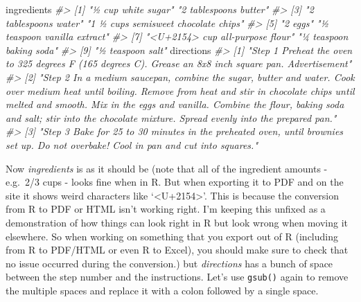 \documentclass[
  12pt,
]{book}
\newenvironment{Shaded}{\begin{snugshade}}{\end{snugshade}}
\newcommand{\CommentTok}[1]{\textcolor[rgb]{0.37,0.37,0.37}{\textit{#1}}}
\newcommand{\NormalTok}[1]{#1}
\begin{document}
\begin{Shaded}
\begin{Highlighting}[]
\NormalTok{ingredients}
\CommentTok{\#\textgreater{} [1] "½ cup white sugar"                  "2 tablespoons butter"              }
\CommentTok{\#\textgreater{} [3] "2 tablespoons water"                "1 ½ cups semisweet chocolate chips"}
\CommentTok{\#\textgreater{} [5] "2  eggs"                            "½ teaspoon vanilla extract"        }
\CommentTok{\#\textgreater{} [7] "\textless{}U+2154\textgreater{} cup all{-}purpose flour"     "¼ teaspoon baking soda"            }
\CommentTok{\#\textgreater{} [9] "½ teaspoon salt"}
\NormalTok{directions}
\CommentTok{\#\textgreater{} [1] "Step 1                                                                                                                                                                                                                                          Preheat the oven to 325 degrees F (165 degrees C). Grease an 8x8 inch square pan.                                                                                                                                                                                                                                                                                      Advertisement"}
\CommentTok{\#\textgreater{} [2] "Step 2                                                                                                                                                                                                                                          In a medium saucepan, combine the sugar, butter and water. Cook over medium heat until boiling. Remove from heat and stir in chocolate chips until melted and smooth. Mix in the eggs and vanilla. Combine the flour, baking soda and salt; stir into the chocolate mixture. Spread evenly into the prepared pan."                                                                   }
\CommentTok{\#\textgreater{} [3] "Step 3                                                                                                                                                                                                                                          Bake for 25 to 30 minutes in the preheated oven, until brownies set up. Do not overbake! Cool in pan and cut into squares."}
\end{Highlighting}
\end{Shaded}

Now \emph{ingredients} is as it should be (note that all of the ingredient amounts - e.g.~2/3 cups - looks fine when in R. But when exporting it to PDF and on the site it shows weird characters like `\textless U+2154\textgreater{}'. This is because the conversion from R to PDF or HTML isn't working right. I'm keeping this unfixed as a demonstration of how things can look right in R but look wrong when moving it elsewhere. So when working on something that you export out of R (including from R to PDF/HTML or even R to Excel), you should make sure to check that no issue occurred during the conversion.) but \emph{directions} has a bunch of space between the step number and the instructions. Let's use \texttt{gsub()} again to remove the multiple spaces and replace it with a colon followed by a single space.
\end{document}
